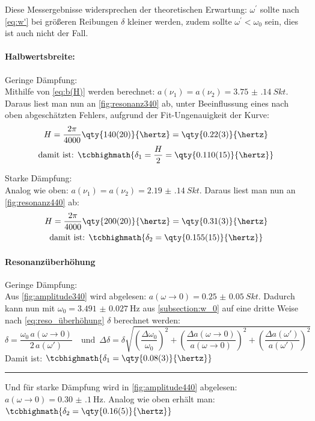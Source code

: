 Diese Messergebnisse widersprechen der theoretischen Erwartung: \(\omega^\prime\) sollte nach \cref{eq:w'} bei größeren Reibungen \(\delta\) kleiner werden, zudem sollte \(\omega^\prime<\omega_0\) sein, dies ist auch nicht der Fall.

\paragraph{Halbwertsbreite:}
Geringe Dämpfung:\\
Mithilfe von \cref{eq:b(H)} werden berechnet:
\(a(\nu_1)=a(\nu_2)=\qty{3.75(14)}{Skt}\). Daraus liest man nun an \cref{fig:resonanz340} ab, unter Beeinflussung eines nach oben abgeschätzten Fehlers, aufgrund der Fit-Ungenauigkeit der Kurve: 
\begin{gather*}
H=\frac{2\pi}{4000}\qty{140(20)}{\hertz}=\qty{0.22(3)}{\hertz}\\
\text{damit ist: }\tcbhighmath{\delta_1=\frac{H}{2}=\qty{0.110(15)}{\hertz}}
\end{gather*}

Starke Dämpfung:\\
Analog wie oben: \(a(\nu_1)=a(\nu_2)=\qty{2.19(14)}{Skt}\). Daraus liest man nun an \cref{fig:resonanz440} ab: 
\begin{gather*}
H=\frac{2\pi}{4000}\qty{200(20)}{\hertz}=\qty{0.31(3)}{\hertz}\\
\text{damit ist: }\tcbhighmath{\delta_2=\qty{0.155(15)}{\hertz}}
\end{gather*}

\paragraph{Resonanzüberhöhung}
Geringe Dämpfung:\\
Aus \cref{fig:amplitude340} wird abgelesen: \(a(\omega\to0)=\qty{0.25(5)}{Skt}\). Dadurch kann nun mit \(\omega_0=\qty{3.491(27)}{\hertz}\) aus \cref{subsection:w_0} auf eine dritte Weise nach \cref{eq:reso_überhöhung} \(\delta\) berechnet werden:
\[\delta=\frac{\omega_0\,a(\omega\to0)}{2\,a(\omega')}\quad\text{und }\,\Delta \delta=\delta\sqrt{\left(\frac{\Delta \omega_0}{\omega_0}\right)^2+\left(\frac{\Delta a(\omega\to0)}{a(\omega\to0)}\right)^2+\left(\frac{\Delta a(\omega')}{a(\omega')}\right)^2}\]
Damit ist:
\(\tcbhighmath{\delta_1=\qty{0.08(3)}{\hertz}}\)

\rule{\textwidth}{0.2pt}

Und für starke Dämpfung wird in \cref{fig:amplitude440} abgelesen: \(a(\omega\to0)=\qty{0.30(10)}{\hertz}\). Analog wie oben erhält man:
\(\tcbhighmath{\delta_2=\qty{0.16(5)}{\hertz}}\)

